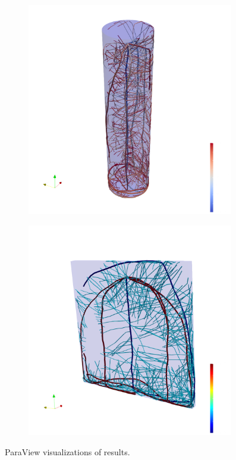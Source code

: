 \begin{figure}
\begin{subfigure}[c]{0.5\textwidth}
\includegraphics[width=0.99\textwidth]{figures/topics_virtual_a.png}
\end{subfigure}
\begin{subfigure}[c]{0.5\textwidth}
\includegraphics[width=0.99\textwidth]{figures/topics_virtual_b.png}
\end{subfigure}
\caption{ParaView visualizations of results.} \label{fig:topics_virtual}
\end{figure}

